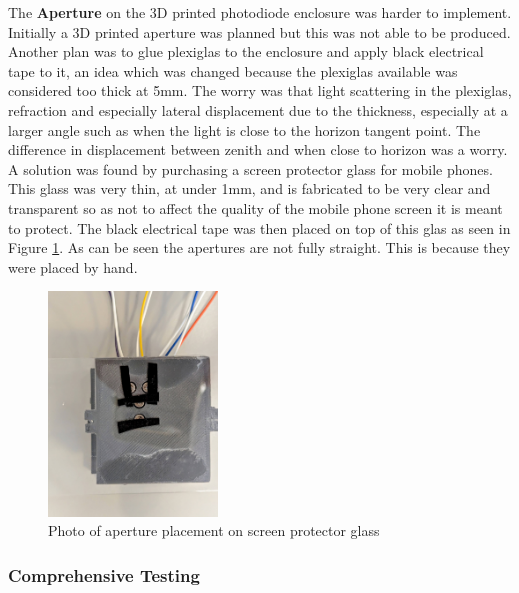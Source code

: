 \noindent The {\bfseries Aperture} on the 3D printed photodiode enclosure was harder to implement. Initially a 3D printed aperture was planned but this was not able to be produced. Another plan was to glue plexiglas to the enclosure and apply black electrical tape to it, an idea which was changed because the plexiglas available was considered too thick at 5mm. The worry was that light scattering in the plexiglas, refraction and especially lateral displacement due to the thickness,  especially at a larger angle such as when the light is close to the horizon tangent point. The difference in displacement between zenith and when close to horizon was a worry. A solution was found by purchasing a screen protector glass for mobile phones. This glass was very thin, at under 1mm, and is fabricated to be very clear and transparent so as not to affect the quality of the mobile phone screen it is meant to protect.
The black electrical tape was then placed on top of this glas as seen in Figure \ref{fig:aperturePhoto}. As can be seen the apertures are not fully straight. This is because they were placed by hand. 
%
\begin{figure}[htbp] %
  \centering
  \includegraphics[width=0.4\textwidth]{chapters/methodology/prototype/aperture_photo.jpg}
  \caption{Photo of aperture placement on screen protector glass}
  \label{fig:aperturePhoto}
\end{figure}

\subsubsection*{Comprehensive Testing}







